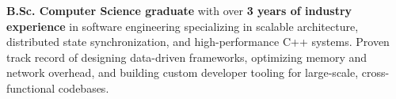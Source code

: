 

\begin{cvparagraph}

\textbf{B.Sc. Computer Science graduate} with over \textbf{3 years of industry experience} in software engineering specializing in scalable architecture, distributed state synchronization, and high-performance C++ systems. Proven track record of designing data-driven frameworks, optimizing memory and network overhead, and building custom developer tooling for large-scale, cross-functional codebases.

\end{cvparagraph}
